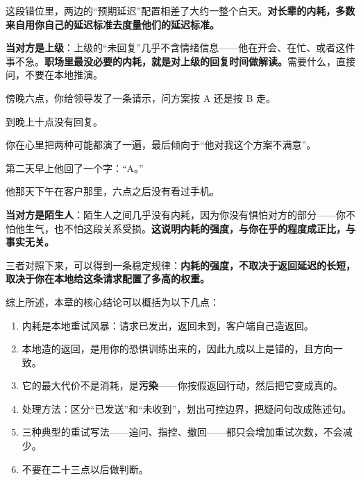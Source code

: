 这段错位里，两边的“预期延迟”配置相差了大约一整个白天。\textbf{对长辈的内耗，多数来自用你自己的延迟标准去度量他们的延迟标准。}

\textbf{当对方是上级}：上级的“未回复”几乎不含情绪信息——他在开会、在忙、或者这件事不急。\textbf{职场里最没必要的内耗，就是对上级的回复时间做解读。}需要什么，直接问，不要在本地推演。

\begin{mdquote}
傍晚六点，你给领导发了一条请示，问方案按 A 还是按 B 走。\par
\vspace{0.3\baselineskip}
到晚上十点没有回复。\par
\vspace{0.3\baselineskip}
你在心里把两种可能都演了一遍，最后倾向于“他对我这个方案不满意”。\par
\vspace{0.3\baselineskip}
第二天早上他回了一个字：“A。”\par
\vspace{0.3\baselineskip}
他那天下午在客户那里，六点之后没有看过手机。
\end{mdquote}

\textbf{当对方是陌生人}：陌生人之间几乎没有内耗，因为你没有惧怕对方的部分——你不怕他生气，也不怕这段关系受损。\textbf{这说明内耗的强度，与你在乎的程度成正比，与事实无关。}

三者对照下来，可以得到一条稳定规律：\textbf{内耗的强度，不取决于返回延迟的长短，取决于你在本地给这条请求配置了多高的权重。}

\hcirule


综上所述，本章的核心结论可以概括为以下几点：

\begin{enumerate}[label=\bfseries\arabic*., leftmargin=2.4em, labelsep=0.7em,
                  itemsep=0.45em, topsep=0.2em, parsep=0.2em]
\item 内耗是本地重试风暴：请求已发出，返回未到，客户端自己造返回。
\item 本地造的返回，是用你的恐惧训练出来的，因此九成以上是错的，且方向一致。
\item 它的最大代价不是消耗，是\textbf{污染}——你按假返回行动，然后把它变成真的。
\item 处理方法：区分“已发送”和“未收到”，划出可控边界，把疑问句改成陈述句。
\item 三种典型的重试写法——追问、指控、撤回——都只会增加重试次数，不会减少。
\item 不要在二十三点以后做判断。
\end{enumerate}

